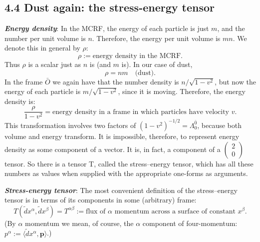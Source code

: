 \documentclass[12pt]{book}
\begin{document}
    \subsection{4.4 Dust again: the stress-energy tensor}

    \textit{\textbf{Energy density}}:
    In the MCRF, the energy of each particle is just \(m\), and the number per unit volume is \(n\). Therefore, the energy per unit volume is \(mn\). We denote this in general by \(\rho\):
    \[
    \rho := \text{energy density in the MCRF}. \tag{4.11}
    \]
    Thus \(\rho\) is a scalar just as \(n\) is (and \(m\) is). In our case of dust,
    \[
    \rho = nm \quad \text{(dust)}. \tag{4.12}
    \]
    In the frame \(\bar{O}\) we again have that the number density is \(n / \sqrt{1 - v^2}\), but now the energy of each particle is \(m / \sqrt{1 - v^2}\), since it is moving. Therefore, the energy density is:
    \[
    \frac{\rho}{1 - v^2} = \text{energy density in a frame in which particles have velocity } v. \tag{4.13}
    \]
    This transformation involves two factors of \((1 - v^2)^{-1/2} = \Lambda^\bar{0} _0\), because both volume and energy transform. It is impossible, therefore, to represent energy density as some component of a vector. It is, in fact, a component of a \( \begin{pmatrix} 2 \\ 0 \end{pmatrix} \) tensor. So there is a tensor T, called the stress–energy tensor, which has all these numbers as values when supplied with the appropriate one-forms as arguments.
    
    \textit{\textbf{Stress-energy tensor}}:
    The most convenient definition of the stress–energy tensor is in terms of its components in some (arbitrary) frame:
    \[
    T(\tilde{d}x^\alpha, \tilde{d}x^\beta) = T^{\alpha\beta} := \text{flux of \(\alpha\) momentum across a surface of constant \(x^\beta\)}. \tag{4.14}
    \]
    (By \(\alpha\) momentum we mean, of course, the \(\alpha\) component of four-momentum: \(p^\alpha := \langle \tilde{d}x^\alpha, \mathbf{p} \rangle\).)
\end{document}
